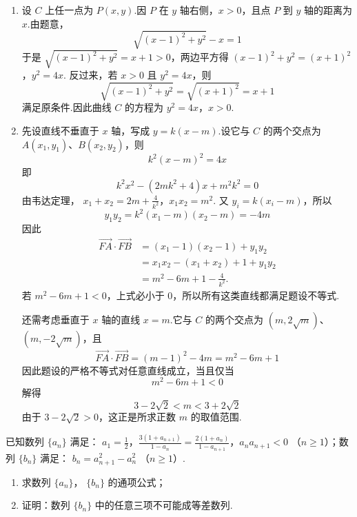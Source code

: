 \begin{solution}
\begin{enumerate}
\item 设 \(C\) 上任一点为 \(P(x,y)\).因 \(P\) 在 \(y\) 轴右侧，\(x>0\)，且点
\(P\) 到 \(y\) 轴的距离为 \(x\).由题意，
\[
\sqrt{(x-1)^2+y^2}-x=1
\]
于是 \(\sqrt{(x-1)^2+y^2}=x+1>0\)，两边平方得
\((x-1)^2+y^2=(x+1)^2\)，\(y^2=4x\).
反过来，若 \(x>0\) 且 \(y^2=4x\)，则
\[
\sqrt{(x-1)^2+y^2}=\sqrt{(x+1)^2}=x+1
\]
满足原条件.因此曲线 \(C\) 的方程为
\(y^2=4x\)，\(x>0\).

\item 先设直线不垂直于 \(x\) 轴，写成 \(y=k(x-m)\).设它与 \(C\) 的两个交点为
\(A(x_1,y_1)\)、\(B(x_2,y_2)\)，则
\[
k^2(x-m)^2=4x
\]
即
\[
k^2x^2-(2mk^2+4)x+m^2k^2=0
\]
由韦达定理，
\(x_1+x_2=2m+\frac4{k^2}\)，\(x_1x_2=m^2\).
又 \(y_i=k(x_i-m)\)，所以
\[
y_1y_2=k^2(x_1-m)(x_2-m)=-4m
\]
因此
\[
\begin{aligned}
\overrightarrow{FA}\cdot\overrightarrow{FB}
&=(x_1-1)(x_2-1)+y_1y_2\\
&=x_1x_2-(x_1+x_2)+1+y_1y_2\\
&=m^2-6m+1-\frac4{k^2}.
\end{aligned}
\]
若 \(m^2-6m+1<0\)，上式必小于 \(0\)，所以所有这类直线都满足题设不等式.

还需考虑垂直于 \(x\) 轴的直线 \(x=m\).它与 \(C\) 的两个交点为
\((m,2\sqrt m)\)、\((m,-2\sqrt m)\)，且
\[
\overrightarrow{FA}\cdot\overrightarrow{FB}
=(m-1)^2-4m=m^2-6m+1
\]
因此题设的严格不等式对任意直线成立，当且仅当
\[
m^2-6m+1<0
\]
解得
\[
3-2\sqrt2<m<3+2\sqrt2
\]
由于 \(3-2\sqrt2>0\)，这正是所求正数 \(m\) 的取值范围.
\end{enumerate}
\end{solution}

\begin{problem}
已知数列 \(\{a_{n}\}\) 满足： \(a_1 = \frac{1}{2}\)，\(\frac{3(1 + a_{n + 1})}{1 - a_n} = \frac{2(1 + a_n)}{1 - a_{n + 1}}\)，\(a_n a_{n + 1} < 0\) （\(n \geqslant 1\)）；数列 \(\{b_n\}\) 满足： \(b_n = a_{n+1}^2 - a_n^2\) （\(n \geqslant 1\)）.

\begin{enumerate}
\item 求数列 \(\{a_{n}\}\)， \(\{b_{n}\}\) 的通项公式；
\item 证明：数列 \(\{b_n\}\) 中的任意三项不可能成等差数列.
\end{enumerate}
\end{problem}

